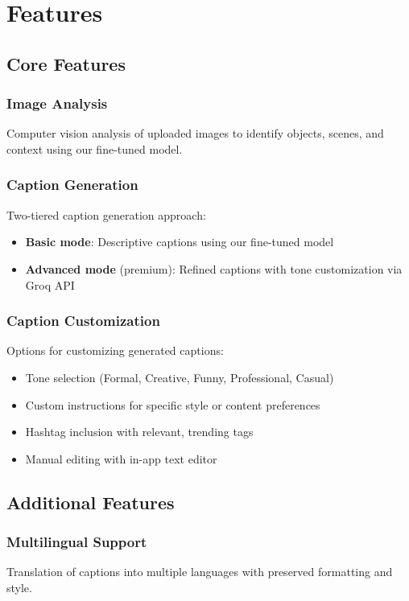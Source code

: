 \documentclass[12pt,a4paper]{report}
\begin{document}
\chapter{Features}
\section{Core Features}
\subsection{Image Analysis}
Computer vision analysis of uploaded images to identify objects, scenes, and context using our fine-tuned model.

\subsection{Caption Generation}
Two-tiered caption generation approach:
\begin{itemize}
    \item \textbf{Basic mode}: Descriptive captions using our fine-tuned model
    \item \textbf{Advanced mode} (premium): Refined captions with tone customization via Groq API
\end{itemize}

\subsection{Caption Customization}
Options for customizing generated captions:
\begin{itemize}
    \item Tone selection (Formal, Creative, Funny, Professional, Casual)
    \item Custom instructions for specific style or content preferences
    \item Hashtag inclusion with relevant, trending tags
    \item Manual editing with in-app text editor
\end{itemize}

\section{Additional Features}
\subsection{Multilingual Support}
Translation of captions into multiple languages with preserved formatting and style.
\end{document}

